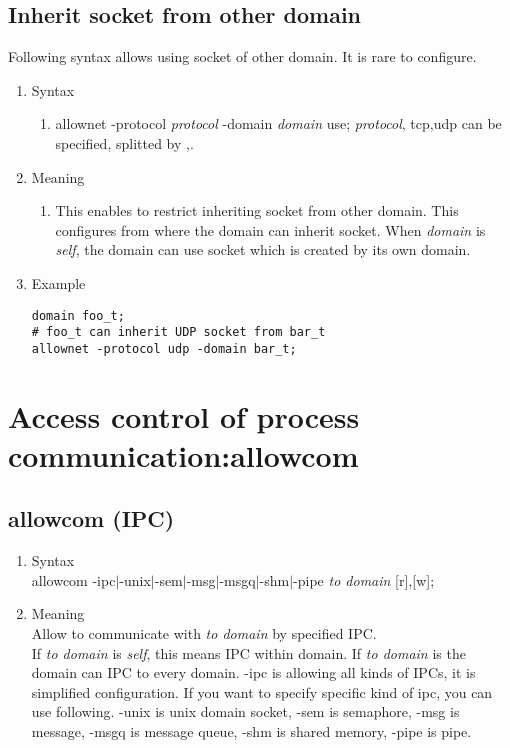 \documentclass{article}
\begin{document}
\subsection{Inherit socket from other domain}\label{sec:socket}
Following syntax allows using socket of other domain. It is rare to configure.
\begin{enumerate}
 \item  Syntax 
	\begin{enumerate}
	 \item allownet -protocol {\it protocol}  -domain {\it domain} use;
	       {\it protocol}, tcp,udp can be specified, splitted by ,.
	\end{enumerate}

 \item Meaning\\
	\begin{enumerate}
	 \item This enables to restrict inheriting socket from other
	       domain. This configures from where the domain can
	       inherit socket. When {\it domain} is {\it self}, the domain can
	       use socket which is created by its own domain. 
	\end{enumerate}
\item Example
\begin{verbatim}
domain foo_t;
# foo_t can inherit UDP socket from bar_t
allownet -protocol udp -domain bar_t; 
\end{verbatim}
\end{enumerate}
\section{Access control of process communication:allowcom}
\subsection{allowcom (IPC)}
\begin{enumerate}
 \item Syntax\\
       allowcom -ipc$\mid$-unix$\mid$-sem$\mid$-msg$\mid$-msgq$\mid$-shm$\mid$-pipe {\it to
       domain} [r],[w];
 \item Meaning\\
       Allow to communicate with {\it  to domain } by specified IPC.\\
       If {\it to domain } is {\it self}, this means IPC within
       domain. If {\it  to domain } is {\it *} the domain can IPC
       to every domain.
       -ipc is allowing all kinds of IPCs, it is simplified
       configuration. If you want to specify specific kind of ipc, you
       can use following.      
       -unix is unix domain socket, -sem is semaphore, -msg is message,
       -msgq is message queue, -shm is shared memory, -pipe is pipe.\\
    
\end{enumerate}
\end{document}
